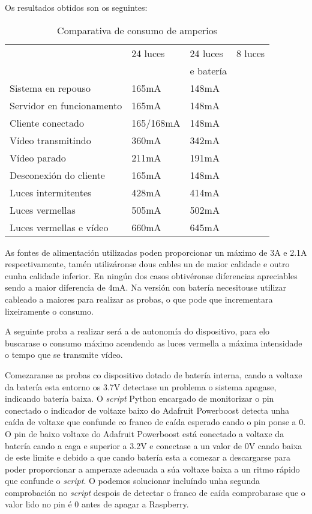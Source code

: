 Os resultados obtidos son os seguintes:

\begin{table}[tb]
    \label{c:comparativa}
    \begin{center}
        \begin{tabular}{|l|l|l|l|}
            \hline
             &  24 luces & 24 luces & 8 luces\\
             & & e batería & \\ \hline
             Sistema en repouso & 165mA & 148mA & \\ \hline
             Servidor en  funcionamento & 165mA & 148mA & \\ \hline
             Cliente conectado & 165/168mA  & 148mA & \\ \hline
             Vídeo transmitindo & 360mA & 342mA & \\ \hline
             Vídeo parado & 211mA & 191mA & \\ \hline
             Desconexión do cliente & 165mA & 148mA & \\ \hline
             Luces intermitentes & 428mA & 414mA & \\ \hline
             Luces vermellas & 505mA & 502mA & \\ \hline
             Luces vermellas e vídeo & 660mA & 645mA & \\ \hline
        \end{tabular}
    \end{center}
    \caption{Comparativa de consumo de amperios}
    \label{tab:my_label}
\end{table}


As fontes de alimentación utilizadas poden proporcionar un máximo de 3A e 2.1A respectivamente, tamén utilizáronse dous cables un de maior calidade e outro cunha calidade inferior. En ningún dos casos obtivéronse diferencias apreciables sendo a maior diferencia de 4mA. Na versión con batería necesitouse utilizar cableado a maiores para realizar as probas, o que pode que incrementara lixeiramente o consumo.

A seguinte proba a realizar será a de autonomía do dispositivo, para elo buscarase o consumo máximo acendendo as luces vermella a máxima intensidade o tempo que se transmite vídeo.

Comezaranse as probas co dispositivo dotado de batería interna, cando a voltaxe da batería esta entorno os 3.7V detectase un problema o sistema apagase, indicando batería baixa. O \emph{script} Python encargado de monitorizar o pin conectado o indicador de voltaxe baixo do Adafruit Powerboost detecta unha caída de voltaxe que confunde co franco de caída esperado cando o pin ponse a 0. O pin de baixo voltaxe do Adafruit Powerboost está conectado a voltaxe da batería cando a caga e superior a 3.2V e conectase a un valor de 0V cando baixa de este limite e debido a que cando batería esta a comezar a descargarse para poder proporcionar a amperaxe adecuada a súa voltaxe baixa a un ritmo rápido que confunde o \emph{script}. O podemos solucionar incluíndo unha segunda comprobación no \emph{script} despois de detectar o franco de caída comprobarase que o valor lido no pin é 0 antes de apagar a Raspberry.

